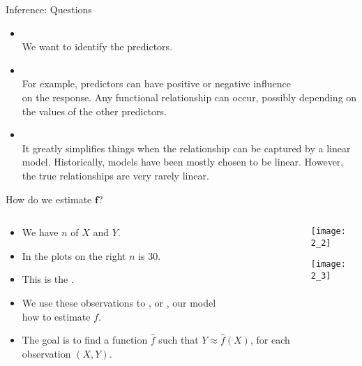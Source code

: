 \documentclass[mathserif, aspectratio=169]{beamer}
\begin{document}
\begin{frame}{Inference: Questions}
	\begin{cpage}
		\begin{itemize}
			\item {}\\
				We want to identify the  predictors.
			\item {}\\
				For example, predictors can have positive or negative influence\\
				on the response. Any functional relationship can occur, 
				possibly depending on the values of the other predictors.
			\item {}\\
				It greatly simplifies things when the relationship can be captured by a linear model.
				Historically, models have been mostly chosen to be linear. However, the true relationships
				are very rarely linear.
		\end{itemize}
	\end{cpage}
\end{frame}

\begin{frame}{How do we estimate $\bm{f}$?}
	\begin{columns}
		\begin{column}{0.7\textwidth}
			\begin{itemize}
				\item We have $n$  of $X$ and $Y$.
				\item In the plots on the right $n$ is 30.
				\item This is the .
				\item We use these observations to , or , our model\\
					how to estimate $f$.
				\item The goal is to find a function $\hat{f}$ such that $Y \approx \hat{f}(X)$,
					for each observation $(X, Y)$.
			\end{itemize}
		\end{column}
		\begin{column}{0.3\textwidth}
			\begin{center}
				\texttt{[image: 2\_2]}
			\end{center}
			\begin{center}
				\texttt{[image: 2\_3]}
			\end{center}
		\end{column}
	\end{columns}
\end{frame}
\end{document}
